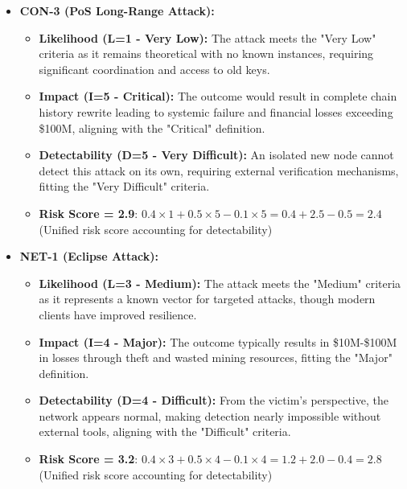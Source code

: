 \begin{itemize}
    \item \textbf{CON-3 (PoS Long-Range Attack):}
    \begin{itemize}
        \item \textbf{Likelihood (L=1 - Very Low):} The attack meets the "Very Low" criteria as it remains theoretical with no known instances, requiring significant coordination and access to old keys.
        \item \textbf{Impact (I=5 - Critical):} The outcome would result in complete chain history rewrite leading to systemic failure and financial losses exceeding \$100M, aligning with the "Critical" definition.
        \item \textbf{Detectability (D=5 - Very Difficult):} An isolated new node cannot detect this attack on its own, requiring external verification mechanisms, fitting the "Very Difficult" criteria.
        \item \textbf{Risk Score = 2.9}: $0.4 \times 1 + 0.5 \times 5 - 0.1 \times 5 = 0.4 + 2.5 - 0.5 = 2.4$ (Unified risk score accounting for detectability)
    \end{itemize}

    \item \textbf{NET-1 (Eclipse Attack):}
    \begin{itemize}
        \item \textbf{Likelihood (L=3 - Medium):} The attack meets the "Medium" criteria as it represents a known vector for targeted attacks, though modern clients have improved resilience.
        \item \textbf{Impact (I=4 - Major):} The outcome typically results in \$10M-\$100M in losses through theft and wasted mining resources, fitting the "Major" definition.
        \item \textbf{Detectability (D=4 - Difficult):} From the victim's perspective, the network appears normal, making detection nearly impossible without external tools, aligning with the "Difficult" criteria.
        \item \textbf{Risk Score = 3.2}: $0.4 \times 3 + 0.5 \times 4 - 0.1 \times 4 = 1.2 + 2.0 - 0.4 = 2.8$ (Unified risk score accounting for detectability)
    \end{itemize}
\end{itemize}